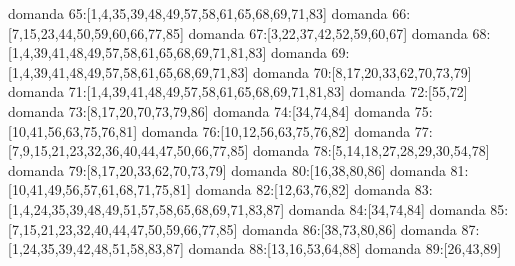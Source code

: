 domanda 65:[1,4,35,39,48,49,57,58,61,65,68,69,71,83]
domanda 66:[7,15,23,44,50,59,60,66,77,85]
domanda 67:[3,22,37,42,52,59,60,67]
domanda 68:[1,4,39,41,48,49,57,58,61,65,68,69,71,81,83]
domanda 69:[1,4,39,41,48,49,57,58,61,65,68,69,71,83]
domanda 70:[8,17,20,33,62,70,73,79]
domanda 71:[1,4,39,41,48,49,57,58,61,65,68,69,71,81,83]
domanda 72:[55,72]
domanda 73:[8,17,20,70,73,79,86]
domanda 74:[34,74,84]
domanda 75:[10,41,56,63,75,76,81]
domanda 76:[10,12,56,63,75,76,82]
domanda 77:[7,9,15,21,23,32,36,40,44,47,50,66,77,85]
domanda 78:[5,14,18,27,28,29,30,54,78]
domanda 79:[8,17,20,33,62,70,73,79]
domanda 80:[16,38,80,86]
domanda 81:[10,41,49,56,57,61,68,71,75,81]
domanda 82:[12,63,76,82]
domanda 83:[1,4,24,35,39,48,49,51,57,58,65,68,69,71,83,87]
domanda 84:[34,74,84]
domanda 85:[7,15,21,23,32,40,44,47,50,59,66,77,85]
domanda 86:[38,73,80,86]
domanda 87:[1,24,35,39,42,48,51,58,83,87]
domanda 88:[13,16,53,64,88]
domanda 89:[26,43,89]

